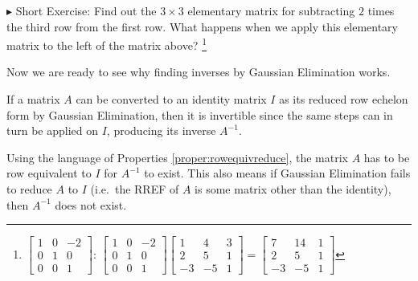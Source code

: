 $\blacktriangleright$ Short Exercise: Find out the $3 \times 3$ elementary matrix for subtracting $2$ times the third row from the first row. What happens when we apply this elementary matrix to the left of the matrix above? \footnote{$
\begin{bmatrix}
1 & 0 & -2 \\
0 & 1 & 0 \\
0 & 0 & 1
\end{bmatrix}$:  
$\begin{bmatrix}
1 & 0 & -2 \\
0 & 1 & 0 \\
0 & 0 & 1
\end{bmatrix}
\begin{bmatrix}
1 & 4 & 3 \\
2 & 5 & 1 \\
-3 & -5 & 1
\end{bmatrix}
=
\begin{bmatrix}
7 & 14 & 1 \\
2 & 5 & 1 \\
-3 & -5 & 1
\end{bmatrix}
$}\par
Now we are ready to see why finding inverses by Gaussian Elimination works.
\begin{thm}
\label{thm:Gausselimprincip}
If a matrix $A$ can be converted to an identity matrix $I$ as its reduced row echelon form by Gaussian Elimination, then it is invertible since the same steps can in turn be applied on $I$, producing its inverse $A^{-1}$. 
\end{thm}
Using the language of Properties \ref{proper:rowequivreduce}, the matrix $A$ has to be row equivalent to $I$ for $A^{-1}$ to exist. This also means if Gaussian Elimination fails to reduce $A$ to $I$ (i.e.\ the RREF of $A$ is some matrix other than the identity), then $A^{-1}$ does not exist.

